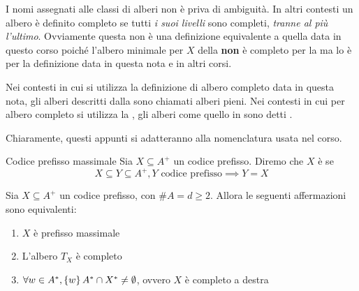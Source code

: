 \begin{note}{}
  I nomi assegnati alle classi di alberi non è priva di ambiguità.
  In altri contesti un albero è definito completo se tutti \textit{i suoi livelli} sono completi, \textit{tranne al più l'ultimo}.
  Ovviamente questa non è una definizione equivalente a quella data in questo corso poiché l'albero minimale per \(X\) della  \textbf{non} è completo per la  ma lo è per la definizione data in questa nota e in altri corsi.

  Nei contesti in cui si utilizza la definizione di albero completo data in questa nota, gli alberi descritti dalla  sono chiamati alberi pieni.
  Nei contesti in cui per albero completo si utilizza la , gli alberi come quello in  sono detti .

  Chiaramente, questi appunti si adatteranno alla nomenclatura usata nel corso.
\end{note}

\begin{definition}{Codice prefisso massimale}
  Sia \(X \subseteq A^+\) un codice prefisso. Diremo che \(X\) è  se
  \[X \subseteq Y \subseteq A^+, Y \text{ codice prefisso} \implies Y = X\]
\end{definition}

\begin{theorem}[label=thm:prefix_code_properties]{}
  Sia \(X \subseteq A^+\) un codice prefisso, con \(\# A = d \geq 2\). Allora le seguenti affermazioni sono equivalenti:
  \begin{enumerate}
    \item \(X\) è prefisso massimale
    \item L'albero \(T_X\) è completo
    \item \(\forall w \in A^*, \set{w}A^*\cap X^* \neq \emptyset\), ovvero \(X\) è completo a destra
  \end{enumerate}
\end{theorem}

